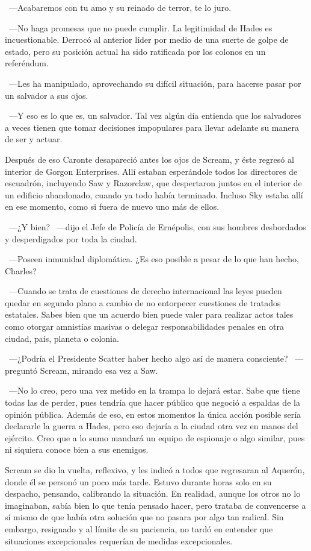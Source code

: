 ~---Acabaremos con tu amo y su reinado de terror, te lo juro.

~---No haga promesas que no puede cumplir. La legitimidad de Hades es incuestionable. Derrocó al anterior líder por medio de una suerte de golpe de estado, pero su posición actual ha sido ratificada por los colonos en un referéndum.

~---Les ha manipulado, aprovechando su difícil situación, para hacerse pasar por un salvador a sus ojos.

~---Y eso es lo que es, un salvador. Tal vez algún día entienda que los salvadores a veces tienen que tomar decisiones impopulares para llevar adelante su manera de ser y actuar.

Después de eso Caronte desapareció antes los ojos de Scream, y éste regresó al interior de Gorgon Enterprises. Allí estaban esperándole todos los directores de escuadrón, incluyendo Saw y Razorclaw, que despertaron juntos en el interior de un edificio abandonado, cuando ya todo había terminado. Incluso Sky estaba allí en ese momento, como si fuera de nuevo uno más de ellos.

~---¿Y bien? ~---dijo el Jefe de Policía de Ernépolis, con sus hombres desbordados y desperdigados por toda la ciudad.

~---Poseen inmunidad diplomática. ¿Es eso posible a pesar de lo que han hecho, Charles?

~---Cuando se trata de cuestiones de derecho internacional las leyes pueden quedar en segundo plano a cambio de no entorpecer cuestiones de tratados estatales. Sabes bien que un acuerdo bien puede valer para realizar actos tales como otorgar amnistías masivas o delegar responsabilidades penales en otra ciudad, país, planeta o colonia.

~---¿Podría el Presidente Scatter haber hecho algo así de manera consciente? ~---preguntó Scream, mirando esa vez a Saw.

~---No lo creo, pero una vez metido en la trampa lo dejará estar. Sabe que tiene todas las de perder, pues tendría que hacer público que negoció a espaldas de la opinión pública. Además de eso, en estos momentos la única acción posible sería declararle la guerra a Hades, pero eso dejaría a la ciudad otra vez en manos del ejército. Creo que a lo sumo mandará un equipo de espionaje o algo similar, pues ni siquiera conoce bien a sus enemigos.

Scream se dio la vuelta, reflexivo, y les indicó a todos que regresaran al Aquerón, donde él se personó un poco más tarde. Estuvo durante horas solo en su despacho, pensando, calibrando la situación. En realidad, aunque los otros no lo imaginaban, sabía bien lo que tenía pensado hacer, pero trataba de convencerse a sí mismo de que había otra solución que no pasara por algo tan radical. Sin embargo, resignado y al límite de su paciencia, no tardó en entender que situaciones excepcionales requerían de medidas excepcionales.

